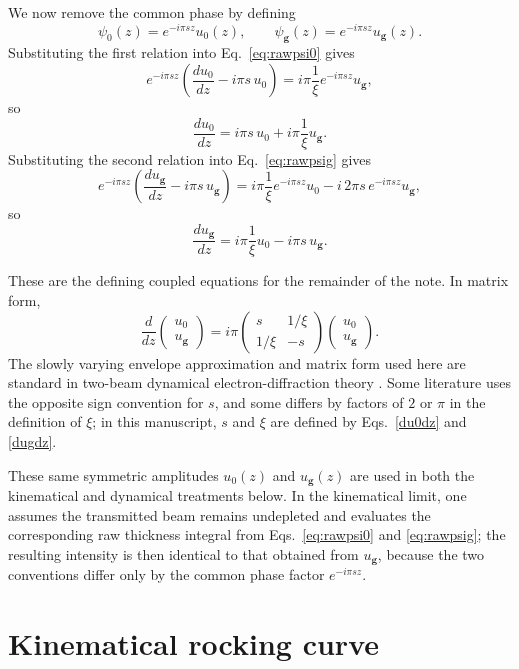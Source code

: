 \documentclass[11pt]{article}
\begin{document}
We now remove the common phase by defining
\[
\psi_0(z)=e^{-i\pi s z}u_0(z),
\qquad
\psi_{\mathbf g}(z)=e^{-i\pi s z}u_{\mathbf g}(z).
\]
Substituting the first relation into Eq.~\eqref{eq:rawpsi0} gives
\[
e^{-i\pi s z}\left(\frac{d u_0}{dz}-i\pi s\,u_0\right)
=
i\pi \frac{1}{\xi} e^{-i\pi s z}u_{\mathbf g},
\]
so
\begin{equation}\label{du0dz}
\frac{d u_0}{dz}= i\pi s\,u_0 + i\pi \frac{1}{\xi}u_{\mathbf g}.
\end{equation}
Substituting the second relation into Eq.~\eqref{eq:rawpsig} gives
\[
e^{-i\pi s z}\left(\frac{d u_{\mathbf g}}{dz}-i\pi s\,u_{\mathbf g}\right)
=
i\pi \frac{1}{\xi} e^{-i\pi s z}u_0
-i\,2\pi s\,e^{-i\pi s z}u_{\mathbf g},
\]
so
\begin{equation}\label{dugdz}
\frac{d u_{\mathbf g}}{dz}= i\pi \frac{1}{\xi}u_0 - i\pi s\,u_{\mathbf g}.
\end{equation}

These are the defining coupled equations for the remainder of the note. In matrix form,
\[
\frac{d}{dz}
\begin{pmatrix}
u_0\\
u_{\mathbf g}
\end{pmatrix}
=
i\pi
\begin{pmatrix}
s & 1/\xi\\
1/\xi & -s
\end{pmatrix}
\begin{pmatrix}
u_0\\
u_{\mathbf g}
\end{pmatrix}.
\]
The slowly varying envelope approximation and matrix form used here are standard in two-beam dynamical electron-diffraction theory \cite{MoodieCowleyGoodman_DynamicalED}. Some literature uses the opposite sign convention for \(s\), and some differs by factors of \(2\) or \(\pi\) in the definition of \(\xi\); in this manuscript, \(s\) and \(\xi\) are defined by Eqs.~\eqref{du0dz} and \eqref{dugdz}.

These same symmetric amplitudes \(u_0(z)\) and \(u_{\mathbf g}(z)\) are used in both the kinematical and dynamical treatments below. In the kinematical limit, one assumes the transmitted beam remains undepleted and evaluates the corresponding raw thickness integral from Eqs.~\eqref{eq:rawpsi0} and \eqref{eq:rawpsig}; the resulting intensity is then identical to that obtained from \(u_{\mathbf g}\), because the two conventions differ only by the common phase factor \(e^{-i\pi s z}\).

\section{Kinematical rocking curve}\label{sec:kinematical}
\end{document}
